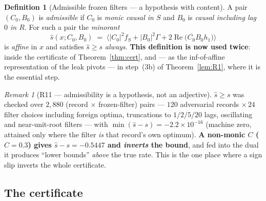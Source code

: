 \documentclass[11pt]{article}
\theoremstyle{definition}
\newtheorem{definition}{Definition}
\theoremstyle{remark}
\newtheorem{remark}{Remark}
\begin{document}
\begin{definition}[Admissible frozen filters --- a hypothesis with
content]
\label{def:adm}
A pair $(C_0,B_0)$ is \emph{admissible} if $C_0$ is \emph{monic causal
in $S$} and $B_0$ is \emph{causal including lag $0$ in $R$}. For such a
pair the \emph{minorant}
\[
\hat s(x;C_0,B_0)\;=\;\bigl\langle|C_0|^2f_S+|B_0|^2\Gamma
+2\operatorname{Re}\bigl(\overline{C_0}B_0h_1\bigr)\bigr\rangle
\]
is \emph{affine} in $x$ and satisfies $\hat s\ge s$ \emph{always}.
\textbf{This definition is now used twice}: inside the certificate of
Theorem~\ref{thm:cert}, and --- as the inf-of-affine representation of
the leak pivots --- in step~(3b) of Theorem~\ref{lem:R1}, where it is
the essential step.
\end{definition}

\begin{remark}[R11 --- admissibility is a hypothesis, not an adjective]
\label{rem:R11}
$\hat s\ge s$ was checked over $2{,}880$ (record $\times$ frozen-filter)
pairs --- $120$ adversarial records $\times\,24$ filter choices
including foreign optima, truncations to $1/2/5/20$ lags, oscillating
and near-unit-root filters --- with $\min(\hat s-s)=-2.2\times10^{-16}$
(machine zero, attained only where the filter \emph{is} that record's
own optimum). \textbf{A non-monic $C$ ($C=0.3$) gives
$\hat s-s=-0.5447$ and \emph{inverts} the bound}, and fed into the dual
it produces ``lower bounds'' \emph{above} the true rate. This is the
one place where a sign slip inverts the whole certificate.
\end{remark}

\subsection{The certificate}
\end{document}
